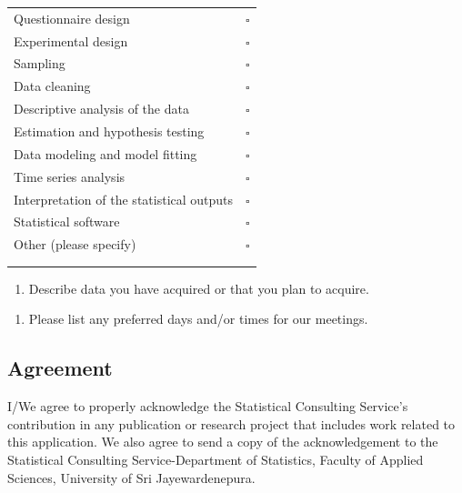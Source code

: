 \documentclass[
  a4paper]{article}
\providecommand{\tightlist}{%
  \setlength{\itemsep}{0pt}\setlength{\parskip}{0pt}}
\begin{document}
\begin{table}[!h]
\center
\begin{tabular}{l|l}
\hline
Questionnaire design & $\square$ \\ 
Experimental design &  $\square$  \\ 
Sampling &   $\square$ \\
Data cleaning &  $\square$\\
Descriptive analysis of the data &  $\square$\\
Estimation and hypothesis testing &  $\square$\\
Data modeling and model fitting &  $\square$ \\
Time series analysis &  $\square$ \\
Interpretation of the statistical outputs &  $\square$\\
Statistical software &  $\square$\\
Other (please specify) &  $\square$\\
 &  \\
 &  \\
\hline
\end{tabular}
\end{table}

\begin{enumerate}
\def\labelenumi{\arabic{enumi}.}
\setcounter{enumi}{5}
\tightlist
\item
  Describe data you have acquired or that you plan to acquire.
\end{enumerate}

\vspace{3cm}

\begin{enumerate}
\def\labelenumi{\arabic{enumi}.}
\setcounter{enumi}{6}
\tightlist
\item
  Please list any preferred days and/or times for our meetings.
\end{enumerate}

\vspace{1cm}

\hypertarget{agreement}{%
\subsection{Agreement}\label{agreement}}

I/We agree to properly acknowledge the Statistical Consulting Service's
contribution in any publication or research project that includes work
related to this application. We also agree to send a copy of the
acknowledgement to the Statistical Consulting Service-Department of
Statistics, Faculty of Applied Sciences, University of Sri
Jayewardenepura.
\end{document}
